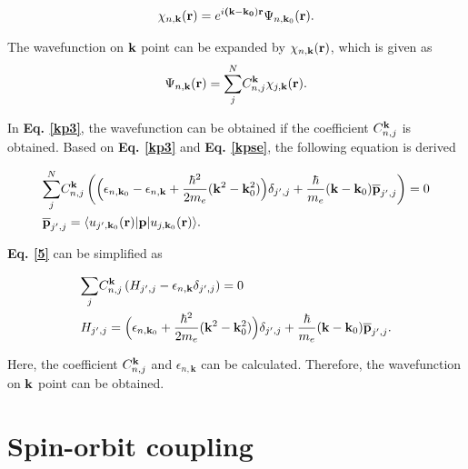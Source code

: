 \documentclass[a4paper, 12pt, titlepage,oneside,drop]{kthesis}
\begin{document}
\begin{equation}\label{kp2}
\chikp<n><\textbf k> = \expg<(\bold k-\bold {k_0})>  \wfbloch<n><\textbf{k}_0>.
\end{equation}

The wavefunction on ${ \textbf k}$ point can be expanded by $\chikp<n><\textbf k> $, which is given as
\begin{equation}\label{kp3}
\wfbloch<n><\bold k> =  {\sum\limits_{j}^{N}} C_{n,j}^{\bold k} \chikp<j><\bold k>. 
\end{equation}

In \textbf{Eq. \ref{kp3}}, the wavefunction can be obtained if the coefficient $C_{n,j}^{\bold k}$ is obtained. Based on \textbf{Eq. \ref{kp3}} and  \textbf{Eq. \ref{kpse}}, the following equation is derived

\begin{equation}\begin{split}\label{5}
& {\sum\limits_{j}^{N}}  C_{n,j}^{\bold k} \left(  \Big(  \epsilon_{n,\textbf{k}_0} -  \epsilon_{n,\textbf{k}}  + \frac{{\hbar}^2}{2m_e} { (\bold {k}^2- \bold {k}_0^2)}    \Big) \delta_{j',j} + \frac{\hbar}{m_e} {(\bold {k}-\bold{k}_0)} {\overline{\textbf{p}}_{j',j}} \right ) = 0 \\
& {\overline{\textbf{p}}_{j',j}} = \langle \ubloch<j'><\textbf{k}_0>| {\textbf p} | \ubloch<j><\textbf{k}_0>  \rangle.
\end{split}
\end{equation}

\textbf{Eq. \ref{5}} can be simplified as
 
\begin{equation}\begin{split}\label{6}
& {\sum\limits_{j}} C_{n,j}^{\bold {k}} \left ( H_{j',j}-  \epsilon_{n,\textbf{k}} \delta_{j',j} \right ) =0 \\
& H_{j',j} = \Big(   \epsilon_{n,\textbf{k}_0}  + \frac{{\hbar}^2}{2m_e} { (\bold{k}^2-\bold{k}_0^2)}    \Big) \delta_{j',j} + \frac{\hbar}{m_e} {(\bold{k}-\bold{k}_0)} {\overline{\textbf{p}}_{j',j}}.
\end{split}
\end{equation}

Here, the coefficient $ C_{n,j}^{\bold k}$ and $\epsilon_{n,\textbf{k}}$ can be calculated. Therefore, the wavefunction on ${ \textbf k}$ point can be obtained.


\section{Spin-orbit coupling}
\label{srasoc}
\end{document}
